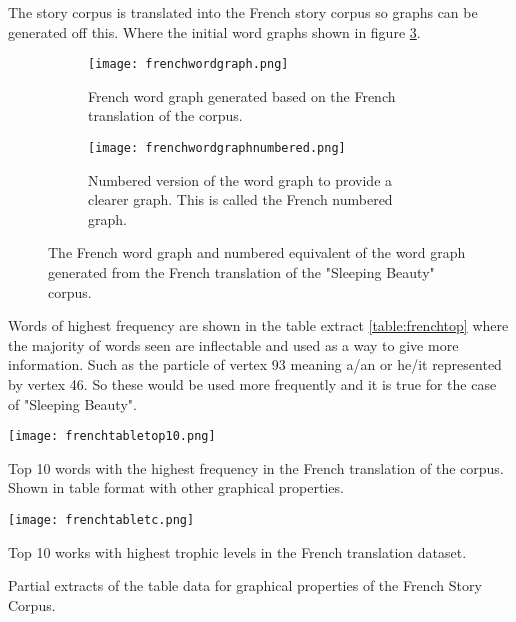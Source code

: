 The story corpus is translated into the French story corpus so graphs can be generated off this. Where the initial word graphs shown in figure \ref{fig:fregraph}. 

\begin{figure}[H]
\centering
\begin{subfigure}{.45\textwidth}
	\texttt{[image: frenchwordgraph.png]}
	\caption{French word graph generated based on the French translation of the corpus.}
	\label{fig:freword}
\end{subfigure}
\hfill
\begin{subfigure}{.45\textwidth}
	\texttt{[image: frenchwordgraphnumbered.png]}
	\caption{Numbered version of the word graph to provide a clearer graph. This is called the French numbered graph.}
	\label{fig:frenum}
\end{subfigure}
\caption{The French word graph and numbered equivalent of the word graph generated from the French translation of the "Sleeping Beauty" corpus.}
\label{fig:fregraph}
\end{figure}

Words of highest frequency are shown in the table extract \ref{table:frenchtop} where the majority of words seen are inflectable and used as a way to give more information. Such as the particle of vertex 93 meaning a/an or he/it represented by vertex 46. So these would be used more frequently and it is true for the case of "Sleeping Beauty".

\begin{table}[H]
\centering
\begin{subtable}{.45\textwidth}
	\texttt{[image: frenchtabletop10.png]}
	\caption{Top 10 words with the highest frequency in the French translation of the corpus. Shown in table format with other graphical properties. }
	\label{table:frenchtop}
\end{subtable}
\hfill
\begin{subtable}{.45\textwidth}
	\hspace{1.5cm} 
	\texttt{[image: frenchtabletc.png]}
	\caption{Top 10 works with highest trophic levels in the French translation dataset.}
	\label{table:frenchtoptc}
\end{subtable}
\caption{Partial extracts of the table data for graphical properties of the French Story Corpus.}
\end{table}

